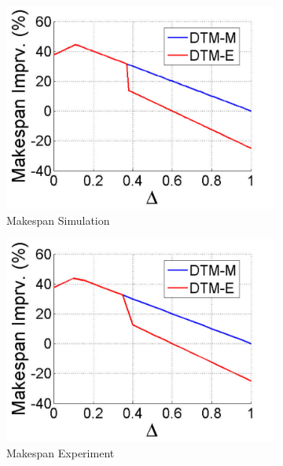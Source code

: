 \begin{figure}[!t]
	\centering
	\begin{subfigure}{.5\columnwidth}
		\centering
		\includegraphics[width=\columnwidth]{./figures/flc_80_delta_makespan_theory}
		\caption{Makespan Simulation}
		\label{fig:Flc80-delta-makespan-theory}
	\end{subfigure}
	\begin{subfigure}{.5\columnwidth}
		\centering
		\includegraphics[width=\columnwidth]{./figures/flc_80_delta_makespan}
		\caption{Makespan Experiment}
		\label{fig:Flc80-delta-makespan}
	\end{subfigure}
	\begin{subfigure}{.5\columnwidth}
		\centering

\end{subfigure}
\end{figure}
